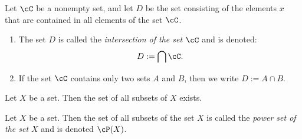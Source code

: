     \begin{definition}
        Let $\cC$ be a nonempty set, and let $D$ be the set consisting of the elements $x$ that are contained in all elements of the set $\cC$.
            \begin{enumerate}[label = (\arabic*),itemsep=1pt,topsep=3pt]
                \item The set $D$ is called the \textit{intersection of the set $\cC$} and is denoted:
                    \begin{equation*}
                    \begin{split}
                        D := \bigcap \cC.
                    \end{split}
                    \end{equation*}
                \item If the set $\cC$ contains only two sets $A$ and $B$, then we write $D:= A \cap B$.
                    \begin{center}
                    \end{center}
            \end{enumerate}
    \end{definition}

    \begin{axiom}
        Let $X$ be a set. Then the set of all subsets of $X$ exists.
    \end{axiom}
    
    \begin{definition}
        Let $X$ be a set. Then the set of all subsets of the set $X$ is called the \textit{power set of the set $X$} and is denoted $\cP(X)$.
    \end{definition}

